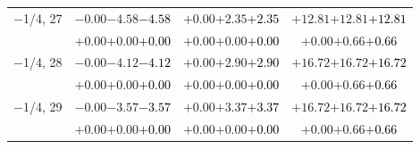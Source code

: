 \documentclass[compress]{beamer}
\begin{document}
\begin{frame}
\begin{tabular}{r | c | c | c}
$-$1/4, 27 & $-0.00$\hspace{0.1 cm}$-4.58$\hspace{0.1 cm}\textcolor{black}{$-4.58$} & $+0.00$\hspace{0.1 cm}$+2.35$\hspace{0.1 cm}\textcolor{black}{$+2.35$} & $+12.81$\hspace{0.1 cm}$+12.81$\hspace{0.1 cm}\textcolor{black}{$+12.81$} \\
           & $+0.00$\hspace{0.1 cm}$+0.00$\hspace{0.1 cm}\textcolor{black}{$+0.00$} & $+0.00$\hspace{0.1 cm}$+0.00$\hspace{0.1 cm}\textcolor{black}{$+0.00$} & $+0.00$\hspace{0.1 cm}$+0.66$\hspace{0.1 cm}\textcolor{black}{$+0.66$} \\
$-$1/4, 28 & $-0.00$\hspace{0.1 cm}$-4.12$\hspace{0.1 cm}\textcolor{black}{$-4.12$} & $+0.00$\hspace{0.1 cm}$+2.90$\hspace{0.1 cm}\textcolor{black}{$+2.90$} & $+16.72$\hspace{0.1 cm}$+16.72$\hspace{0.1 cm}\textcolor{black}{$+16.72$} \\
           & $+0.00$\hspace{0.1 cm}$+0.00$\hspace{0.1 cm}\textcolor{black}{$+0.00$} & $+0.00$\hspace{0.1 cm}$+0.00$\hspace{0.1 cm}\textcolor{black}{$+0.00$} & $+0.00$\hspace{0.1 cm}$+0.66$\hspace{0.1 cm}\textcolor{black}{$+0.66$} \\
$-$1/4, 29 & $-0.00$\hspace{0.1 cm}$-3.57$\hspace{0.1 cm}\textcolor{black}{$-3.57$} & $+0.00$\hspace{0.1 cm}$+3.37$\hspace{0.1 cm}\textcolor{black}{$+3.37$} & $+16.72$\hspace{0.1 cm}$+16.72$\hspace{0.1 cm}\textcolor{black}{$+16.72$} \\
           & $+0.00$\hspace{0.1 cm}$+0.00$\hspace{0.1 cm}\textcolor{black}{$+0.00$} & $+0.00$\hspace{0.1 cm}$+0.00$\hspace{0.1 cm}\textcolor{black}{$+0.00$} & $+0.00$\hspace{0.1 cm}$+0.66$\hspace{0.1 cm}\textcolor{black}{$+0.66$} \\

\end{tabular}
\end{frame}
\end{document}
